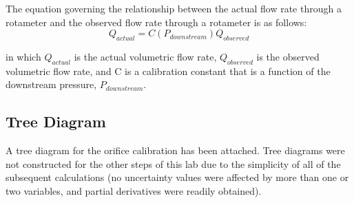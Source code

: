 \documentclass[paper=letter, fontsize=10pt]{scrartcl} %
\begin{document}
\begin{appendices}
The equation governing the relationship between the actual flow rate through a rotameter and the observed flow rate through a rotameter is as follows:
\begin{equation}\label{eq:4}
Q_{actual} = C(P_{downstream}) Q_{observed}
\end{equation}

in which \(Q_{actual}\) is the actual volumetric flow rate, \(Q_{observed}\) is the observed volumetric flow rate, and C is a calibration constant that is a function of the downstream pressure, \(P_{downstream}\).

\subsection{Tree Diagram}\label{app:Tree}
A tree diagram for the orifice calibration has been attached.  Tree diagrams were not constructed for the other steps of this lab due to the simplicity of all of the subsequent calculations (no uncertainty values were affected by more than one or two variables, and partial derivatives were readily obtained).
\fi
\end{appendices}
\end{document}

